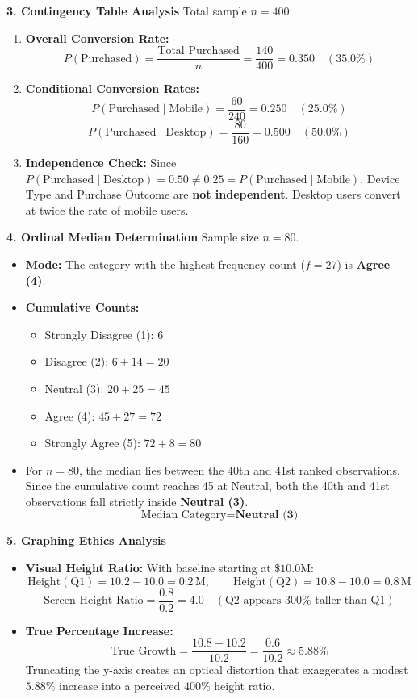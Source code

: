 \textbf{3. Contingency Table Analysis}
Total sample $n = 400$:
\begin{enumerate}
    \item \textbf{Overall Conversion Rate:}
    $$P(\text{Purchased}) = \frac{\text{Total Purchased}}{n} = \frac{140}{400} = \mathbf{0.350 \quad (35.0\%)}$$
    \item \textbf{Conditional Conversion Rates:}
    $$P(\text{Purchased} \mid \text{Mobile}) = \frac{60}{240} = \mathbf{0.250 \quad (25.0\%)}$$
    $$P(\text{Purchased} \mid \text{Desktop}) = \frac{80}{160} = \mathbf{0.500 \quad (50.0\%)}$$
    \item \textbf{Independence Check:} Since $P(\text{Purchased} \mid \text{Desktop}) = 0.50 \neq 0.25 = P(\text{Purchased} \mid \text{Mobile})$, Device Type and Purchase Outcome are \textbf{not independent}. Desktop users convert at twice the rate of mobile users.
\end{enumerate}

\textbf{4. Ordinal Median Determination}
Sample size $n = 80$.
\begin{itemize}
    \item \textbf{Mode:} The category with the highest frequency count ($f = 27$) is \textbf{Agree (4)}.
    \item \textbf{Cumulative Counts:}
    \begin{itemize}
        \item Strongly Disagree (1): $6$
        \item Disagree (2): $6 + 14 = 20$
        \item Neutral (3): $20 + 25 = 45$
        \item Agree (4): $45 + 27 = 72$
        \item Strongly Agree (5): $72 + 8 = 80$
    \end{itemize}
    \item For $n = 80$, the median lies between the 40th and 41st ranked observations. Since the cumulative count reaches 45 at Neutral, both the 40th and 41st observations fall strictly inside \textbf{Neutral (3)}.
    $$\text{Median Category} = \mathbf{\text{Neutral (3)}}$$
\end{itemize}

\textbf{5. Graphing Ethics Analysis}
\begin{itemize}
    \item \textbf{Visual Height Ratio:} With baseline starting at $\$10.0\text{M}$:
    $$\text{Height}(\text{Q1}) = 10.2 - 10.0 = 0.2\,\text{M}, \qquad \text{Height}(\text{Q2}) = 10.8 - 10.0 = 0.8\,\text{M}$$
    $$\text{Screen Height Ratio} = \frac{0.8}{0.2} = \mathbf{4.0} \quad (\text{Q2 appears } 300\% \text{ taller than Q1})$$
    \item \textbf{True Percentage Increase:}
    $$\text{True Growth} = \frac{10.8 - 10.2}{10.2} = \frac{0.6}{10.2} \approx \mathbf{5.88\%}$$
    Truncating the y-axis creates an optical distortion that exaggerates a modest $5.88\%$ increase into a perceived $400\%$ height ratio.
\end{itemize}

